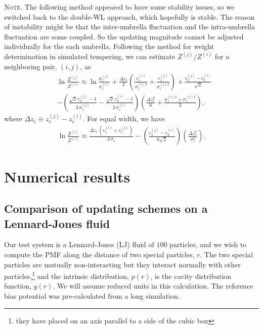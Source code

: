\documentclass[reprint, superscriptaddress, floatfix]{revtex4-1}
\newcommand{\note}[1]{{\color{DarkGreen}\footnotesize \textsc{Note.} #1}}
\begin{document}
\note{The
  following method appeared to have some stability issues,
  so we switched back to the double-WL approach,
  which hopefully is stable.
  The reason of instability might be
  that the inter-umbrella fluctuation
  and the intra-umbrella fluctuation are some coupled.
  So the updating magnitude cannot be adjusted individually
  for the each umbrella.
  Following the method for weight determination
  in simulated tempering\cite{park2007,
  *nguyen2013, *zhang2015st},
  we can estimate $Z^{(j)}/Z^{(i)}$
  for a neighboring pair, $(i, j)$, as
  \begin{align*}
    &\ln\frac{ Z^{(j)} }{ Z^{(i)} }
    \approx
    \ln\frac{ \sigma_z^{(j)} }{ \sigma_z^{(i)} }
    +
    \frac{ \Delta z_c } { 2 }
    \left(
      \frac{ c_1^{(i)} } { \sigma_z^{(i) 2} }
      +
      \frac{ c_1^{(j)} } { \sigma_z^{(j) 2} }
    \right)
    +
    \frac{ c_2^{(j)} - c_2^{(i)} } { \sqrt 2 }
    \\
    &-
    \left(
      \frac{ \sqrt 2 \, c_2^{(j)} - 1 }
           { 2 \, \sigma_z^{(j)} }
      -
      \frac{ \sqrt 2 \, c_2^{(i)} - 1 }
           { 2 \, \sigma_z^{(i)} }
    \right)
    \left(
      \frac{ \Delta z_c^{2} } { 6 }
      +
      \frac{ \sigma_z^{(i) 2} + \sigma_z^{(j) 2} } { 2 }
    \right)
    ,
  \end{align*}
  where
  $\Delta z_c \equiv z_c^{(j)} - z_c^{(i)}$.
  For equal width, we have
  \begin{align*}
    \ln\frac{ Z^{(j)} }{ Z^{(i)} }
    \approx
    \frac{ \Delta z_c \, ( c_1^{(i)} + c_1^{(j)} ) } { 2 \, \sigma_z }
    -
    \left(
      \frac{ c_2^{(j)} - c_2^{(i)} }
           { 6 \sqrt 2 }
    \right)
    \left(
      \frac{ \Delta z_c^{2} } { \sigma_z^2 }
    \right)
    .
  \end{align*}
}



\section{\label{sec:results}
Numerical results}



\subsection{\label{sec:lj}
Comparison of updating schemes on a Lennard-Jones fluid}


Our test system is a Lennard-Jones (LJ) fluid of $100$ particles,
and we wish to compute the PMF along the distance of two special particles, $r$.
%
The two special particles are mutually non-interacting
but they interact normally with other particles,\footnote{they
have placed on an axis parallel to a side of the cubic box}
and the intrinsic distribution, $p(r)$, is
the cavity distribution function, $y(r)$\cite{hansen}.
%
We will assume reduced units in this calculation.
%
The reference bias potential was pre-calculated from a long simulation.
\end{document}
